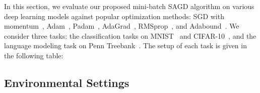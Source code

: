 \documentclass[11pt]{article}
\begin{document}
In this section, we evaluate our proposed mini-batch \textsc{SAGD} algorithm on various deep learning models against popular optimization methods: SGD with momentum~\citep{qian1999momentum}, Adam~\citep{kiba15}, Padam~\citep{chgu2018},  AdaGrad~\citep{duha11},  RMSprop~\citep{tige12}, and Adabound~\citep{luxi2019}. 
We consider three tasks: the classification tasks on MNIST~\citep{lebo1998} and CIFAR-10~\citep{krhi2009}, and the language modeling task on Penn Treebank~\citep{mama1993}. 
The setup of each task is given in the following table:
 \begin{table}[H]
 	\centering
 	\label{tab::network_setup}
 \end{table}


\subsection{Environmental Settings}
\end{document}
